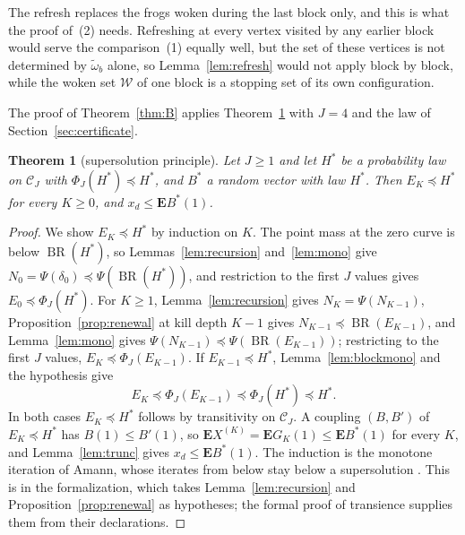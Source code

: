 \documentclass[11pt]{amsart}
\newtheorem{theorem}{Theorem}[section]
\theoremstyle{definition}
\numberwithin{equation}{section}
\newcommand{\lean}[1]{\ignorespaces}
\newcommand{\E}{\mathbf{E}}
\newcommand{\BR}{\operatorname{BR}}
\newcommand{\cC}{\mathcal{C}}
\newcommand{\cW}{\mathcal{W}}
\newcommand{\stle}{\preceq}
\begin{document}
The refresh replaces the frogs woken during the last block only, and this is what the proof of~(2) needs. Refreshing at every vertex visited by any earlier block would serve the comparison~(1) equally well, but the set of these vertices is not determined by $\tilde\omega_b$ alone, so Lemma~\ref{lem:refresh} would not apply block by block, while the woken set $\cW$ of one block is a stopping set of its own configuration.

The proof of Theorem~\ref{thm:B} applies Theorem~\ref{thm:super} with $J=4$ and the law of Section~\ref{sec:certificate}.

\begin{theorem}[supersolution principle]\label{thm:super}\lean{FrogModel.LemmaX.lemmaXOfSuper_holds, FrogModel.LemmaX.blockInduction_holds, FrogModel.LemmaX.meanOfBlockBound_holds, FrogModel.LemmaX.phiLaw, FrogModel.LemmaX.brLaw, FrogModel.LemmaX.blockLaw}
Let $J\ge1$ and let $H^*$ be a probability law on $\cC_J$ with $\Phi_J(H^*)\stle H^*$, and $B^*$ a random vector with law $H^*$. Then $E_K\stle H^*$ for every $K\ge0$, and $x_d\le\E B^*(1)$.
\end{theorem}

\begin{proof}
We show $E_K\stle H^*$ by induction on $K$. The point mass at the zero curve is below $\BR(H^*)$, so Lemmas~\ref{lem:recursion} and~\ref{lem:mono} give $N_0=\Psi(\delta_0)\stle\Psi(\BR(H^*))$, and restriction to the first $J$ values gives $E_0\stle\Phi_J(H^*)$. For $K\ge1$, Lemma~\ref{lem:recursion} gives $N_K=\Psi(N_{K-1})$, Proposition~\ref{prop:renewal} at kill depth $K-1$ gives $N_{K-1}\stle\BR(E_{K-1})$, and Lemma~\ref{lem:mono} gives $\Psi(N_{K-1})\stle\Psi(\BR(E_{K-1}))$; restricting to the first $J$ values, $E_K\stle\Phi_J(E_{K-1})$. If $E_{K-1}\stle H^*$, Lemma~\ref{lem:blockmono} and the hypothesis give
\[
E_K\stle\Phi_J(E_{K-1})\stle\Phi_J(H^*)\stle H^*.
\]
In both cases $E_K\stle H^*$ follows by transitivity on $\cC_J$. A coupling $(B,B')$ of $E_K\stle H^*$ has $B(1)\le B'(1)$, so $\E X^{(K)}=\E G_K(1)\le\E B^*(1)$ for every $K$, and Lemma~\ref{lem:trunc} gives $x_d\le\E B^*(1)$. The induction is the monotone iteration of Amann, whose iterates from below stay below a supersolution \cite[Theorem~6.1 and Corollary~6.3]{Ama76}. This is  in the formalization, which takes Lemma~\ref{lem:recursion} and Proposition~\ref{prop:renewal} as hypotheses; the formal proof of transience supplies them from their declarations.
\end{proof}
\end{document}
